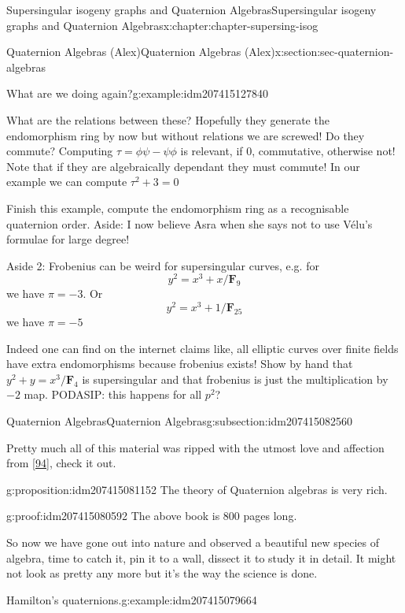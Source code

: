 \documentclass[oneside,10pt,]{book}
\numberwithin{equation}{section}
\newcommand{\FF}{\mathbf{F}}
\begin{document}
\begin{chapterptx}{Supersingular isogeny graphs and Quaternion Algebras}{}{Supersingular isogeny graphs and Quaternion Algebras}{}{}{x:chapter:chapter-supersing-isog}
\begin{sectionptx}{Quaternion Algebras (Alex)}{}{Quaternion Algebras (Alex)}{}{}{x:section:sec-quaternion-algebras}
\begin{introduction}{}
\begin{example}{What are we doing again?}{g:example:idm207415127840}
\par
What are the relations between these? Hopefully they generate the endomorphism ring by now but without relations we are screwed! Do they commute? Computing \(\tau = \phi \psi  - \psi \phi\) is relevant, if 0, commutative, otherwise not! Note that if they are algebraically dependant they must commute! In our example we can compute \(\tau^2 + 3 = 0\)%
\end{example}
Finish this example, compute the endomorphism ring as a recognisable quaternion order.%
Aside: I now believe Asra when she says not to use Vélu's formulae for large degree!%
\par
Aside 2: Frobenius can be weird for supersingular curves, e.g. for%
\begin{equation*}
y^2 = x^{3} + x/\FF_9
\end{equation*}
we have \(\pi = -3\). Or%
\begin{equation*}
y^2 = x^{3} + 1/\FF_{25}
\end{equation*}
we have \(\pi = -5\)%
\par
Indeed one can find on the internet claims like, all elliptic curves over finite fields have extra endomorphisms because frobenius exists!%
Show by hand that \(y^2 + y = x^3/\FF_4\) is supersingular and that frobenius is just the multiplication by \(-2\) map.%
PODASIP: this happens for all \(p^2\)?%
\end{introduction}%
%
%
\typeout{************************************************}
\typeout{************************************************}
%
\begin{subsectionptx}{Quaternion Algebras}{}{Quaternion Algebras}{}{}{g:subsection:idm207415082560}
\begin{introduction}{}%
Pretty much all of this material was ripped with the utmost love and affection from \hyperlink{x:biblio:bib-voight-quat}{[94]}, check it out.%
\begin{proposition}{}{}{g:proposition:idm207415081152}%
The theory of Quaternion algebras is very rich.%
\end{proposition}
\begin{proofptx}{}{g:proof:idm207415080592}
The above book is 800 pages long.%
\end{proofptx}
So now we have gone out into nature and observed a beautiful new species of algebra, time to catch it, pin it to a wall, dissect it to study it in detail. It might not look as pretty any more but it's the way the science is done.%
\begin{example}{Hamilton's quaternions.}{g:example:idm207415079664}%

\end{example}
\end{introduction}
\end{subsectionptx}
\end{sectionptx}
\end{chapterptx}
\end{document}
